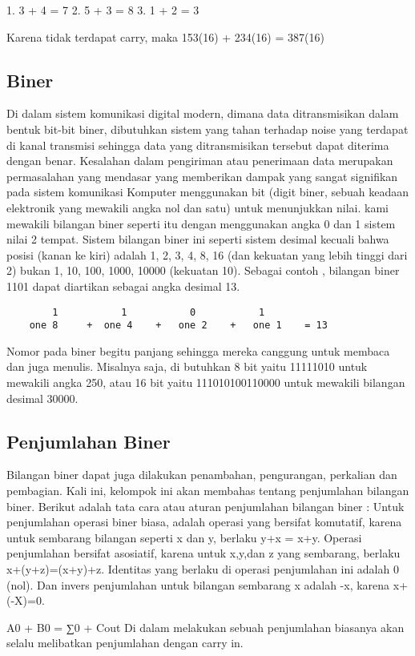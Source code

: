 1. 3 + 4 = 7
2. 5 + 3 = 8
3. 1 + 2 = 3

Karena tidak terdapat carry, maka 153(16) + 234(16) = 387(16)


\subsection {Biner}
Di dalam sistem komunikasi digital modern, dimana data ditransmisikan dalam bentuk bit-bit biner, dibutuhkan sistem yang tahan terhadap noise yang terdapat di kanal transmisi sehingga data yang ditransmisikan tersebut dapat diterima dengan benar. Kesalahan dalam pengiriman atau penerimaan data merupakan permasalahan yang mendasar yang memberikan dampak yang sangat signifikan pada sistem komunikasi
Komputer menggunakan bit (digit biner, sebuah keadaan elektronik yang mewakili angka nol dan satu) untuk menunjukkan nilai. kami mewakili bilangan biner seperti itu dengan menggunakan angka 0 dan 1 sistem nilai 2 tempat. Sistem bilangan biner ini seperti sistem desimal kecuali bahwa posisi (kanan ke kiri) adalah 1, 2, 3, 4, 8, 16 (dan kekuatan yang lebih tinggi dari 2) bukan 1, 10, 100, 1000, 10000 (kekuatan 10). Sebagai contoh , bilangan biner 1101 dapat diartikan sebagai angka desimal 13.
	\begin{verbatim}
		1			1			0			1
	one 8	  +	 one 4	  +	  one 2    +   one 1 	= 13
	\end{verbatim}
Nomor pada  biner begitu panjang sehingga mereka canggung  untuk membaca dan juga menulis. Misalnya saja, di butuhkan 8 bit yaitu  11111010 untuk mewakili angka 250, atau 16 bit yaitu 111010100110000 untuk mewakili bilangan desimal 30000.


\subsection {Penjumlahan Biner}
Bilangan biner dapat juga dilakukan penambahan, pengurangan, perkalian dan pembagian. Kali ini, kelompok ini akan membahas tentang penjumlahan bilangan biner. Berikut adalah tata cara atau aturan penjumlahan bilangan biner :
Untuk penjumlahan operasi biner biasa, adalah operasi yang bersifat komutatif, karena untuk sembarang bilangan seperti x dan y, berlaku y+x = x+y. Operasi penjumlahan bersifat asosiatif, karena untuk x,y,dan z yang sembarang, berlaku x+(y+z)=(x+y)+z. Identitas yang berlaku di operasi penjumlahan ini adalah 0 (nol). Dan invers penjumlahan untuk bilangan sembarang x adalah -x, karena x+(-X)=0.

A0 + B0 = ∑0 + Cout
Di dalam melakukan sebuah penjumlahan biasanya akan selalu melibatkan penjumlahan dengan carry in.

